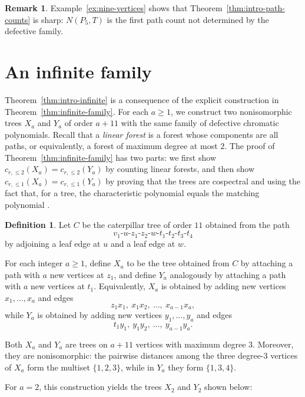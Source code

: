 \documentclass[12pt,reqno]{amsart}
\theoremstyle{definition}
\newtheorem{defn}[thm]{Definition}
\newtheorem{rmk}[thm]{Remark}
\begin{document}
\begin{rmk}
Example~\ref{ex:nine-vertices} shows that Theorem~\ref{thm:intro-path-counts} is sharp: $N(P_5,T)$ is the first path count not determined by the defective family.
\end{rmk}

\section{An infinite family}\label{sec:infinite}

Theorem~\ref{thm:intro-infinite} is a consequence of the explicit construction in Theorem~\ref{thm:infinite-family}. For each $a\geq 1$, we construct two nonisomorphic trees $X_a$ and $Y_a$ of order $a+11$ with the same family of defective chromatic polynomials. Recall that a \emph{linear forest} is a forest whose components are all paths, or equivalently, a forest of maximum degree at most $2$. The proof of Theorem~\ref{thm:infinite-family} has two parts: we first show $c_{r,\leq 2}(X_a)=c_{r,\leq 2}(Y_a)$ by counting linear forests, and then show $c_{r,\leq 1}(X_a)=c_{r,\leq 1}(Y_a)$ by proving that the trees are cospectral and using the fact that, for a tree, the characteristic polynomial equals the matching polynomial \cite[Chapter~2]{God93}.

\begin{defn}\label{def:construction}
Let $C$ be the caterpillar tree of order $11$ obtained from the path
\[
v_1\text{-}u\text{-}z_1\text{-}z_2\text{-}w\text{-}t_1\text{-}t_2\text{-}t_3\text{-}t_4
\]
by adjoining a leaf edge at $u$ and a leaf edge at $w$.

For each integer $a\geq 1$, define $X_a$ to be the tree obtained from $C$ by attaching a path with $a$ new vertices at $z_1$, and define $Y_a$ analogously by attaching a path with $a$ new vertices at $t_1$. Equivalently, $X_a$ is obtained by adding new vertices $x_1,\dots,x_a$ and edges
\[
z_1x_1,\ x_1x_2,\ \dots,\ x_{a-1}x_a,
\]
while $Y_a$ is obtained by adding new vertices $y_1,\dots,y_a$ and edges
\[
t_1y_1,\ y_1y_2,\ \dots,\ y_{a-1}y_a.
\]
\end{defn}

Both $X_a$ and $Y_a$ are trees on $a+11$ vertices with maximum degree $3$. Moreover, they are nonisomorphic: the pairwise distances among the three degree-$3$ vertices of $X_a$ form the multiset $\{1,2,3\}$, while in $Y_a$ they form $\{1,3,4\}$.

For $a=2$, this construction yields the trees $X_2$ and $Y_2$ shown below:
\end{document}
